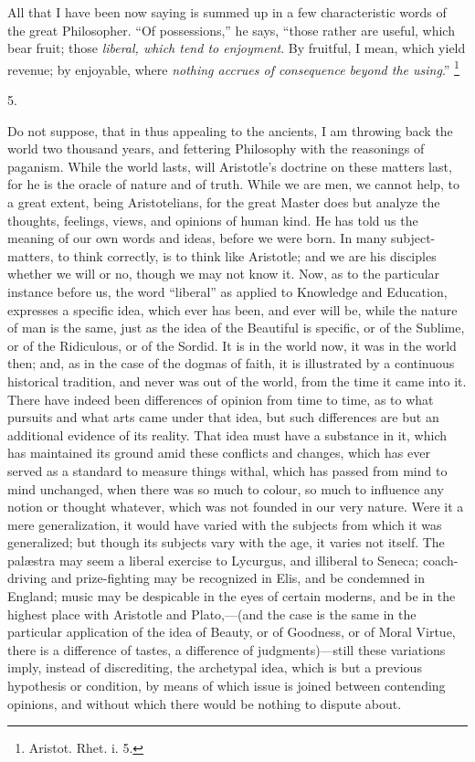 All that I have been now saying is summed up in a few
characteristic words of the great Philosopher. ``Of
possessions,'' he says, ``those rather are useful, which bear
fruit; those \emph{liberal, which tend to enjoyment}. By fruitful, I
mean, which yield revenue; by enjoyable, where \emph{nothing accrues of
consequence beyond the using}.'' \footnote{Aristot. Rhet.
i. 5.}

5.

Do not suppose, that in thus appealing to the ancients, I am
throwing back the world two thousand years, and fettering Philosophy
with the reasonings of paganism. While the world lasts, will Aristotle's
doctrine on these matters last, for he is the oracle of nature and of
truth. While we are men, we cannot help, to a great extent, being
Aristotelians, for the great Master does but analyze the thoughts,
feelings, views, and opinions of human kind. He has told us the
meaning of our own words and ideas, before we were born. In many
subject-matters, to think correctly, is to think like Aristotle; and
we are his disciples whether we will or no, though we may not know it.
Now, as to the particular instance before us, the word
``liberal'' as applied to Knowledge and Education, expresses a
specific idea, which ever has been, and ever will be, while the nature
of man is the same, just as the idea of the Beautiful is specific, or
of the Sublime, or of the Ridiculous, or of the Sordid. It is in the
world now, it was in the world then; and, as in the case of the dogmas
of faith, it is illustrated by a continuous historical tradition, and
never was out of the world, from the time it came into it. There have
indeed been differences of opinion from time to time, as to what
pursuits and what arts came under that idea, but such differences are
but an additional evidence of its reality. That idea must have a
substance in it, which has maintained its ground amid these conflicts
and changes, which has ever served as a standard to measure things
withal, which has passed from mind to mind unchanged, when there was
so much to colour, so much to influence any notion or thought
whatever, which was not founded in our very nature. Were it a mere
generalization, it would have varied with the subjects from which it
was generalized; but though its subjects vary with the age, it varies
not itself. The palæstra may seem a liberal exercise to Lycurgus, and
illiberal to Seneca; coach-driving and prize-fighting may be
recognized in Elis, and be condemned in England; music may be
despicable in the eyes of certain moderns, and be in the highest place
with Aristotle and Plato,—(and the case is the same in the
particular application of the idea of Beauty, or of Goodness, or of
Moral Virtue, there is a difference of tastes, a difference of
judgments)—still these variations imply, instead of
discrediting, the archetypal idea, which is but a previous hypothesis
or condition, by means of which issue is joined between contending
opinions, and without which there would be nothing to dispute about.


